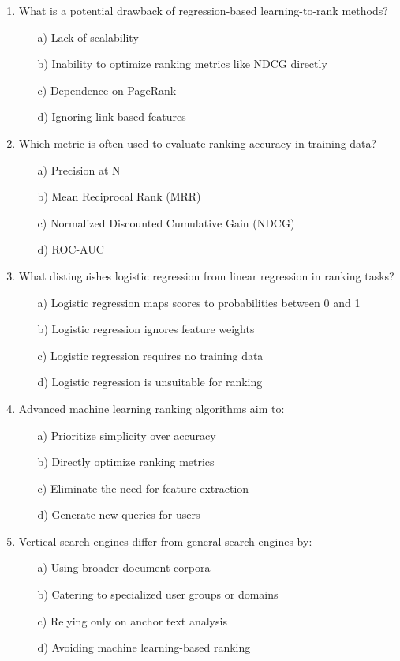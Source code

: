\documentclass[8pt]{extarticle}
\begin{document}
\begin{multicols}{2}
\begin{enumerate}
\item What is a potential drawback of regression-based learning-to-rank methods?
\begin{itemize}
\item[a)] Lack of scalability
\item[b)] Inability to optimize ranking metrics like NDCG directly
\item[c)] Dependence on PageRank
\item[d)] Ignoring link-based features
\end{itemize}

\item Which metric is often used to evaluate ranking accuracy in training data?
\begin{itemize}
\item[a)] Precision at N
\item[b)] Mean Reciprocal Rank (MRR)
\item[c)] Normalized Discounted Cumulative Gain (NDCG)
\item[d)] ROC-AUC
\end{itemize}

\item What distinguishes logistic regression from linear regression in ranking tasks?
\begin{itemize}
\item[a)] Logistic regression maps scores to probabilities between 0 and 1
\item[b)] Logistic regression ignores feature weights
\item[c)] Logistic regression requires no training data
\item[d)] Logistic regression is unsuitable for ranking
\end{itemize}

\item Advanced machine learning ranking algorithms aim to:
\begin{itemize}
\item[a)] Prioritize simplicity over accuracy
\item[b)] Directly optimize ranking metrics
\item[c)] Eliminate the need for feature extraction
\item[d)] Generate new queries for users
\end{itemize}

\item Vertical search engines differ from general search engines by:
\begin{itemize}
\item[a)] Using broader document corpora
\item[b)] Catering to specialized user groups or domains
\item[c)] Relying only on anchor text analysis
\item[d)] Avoiding machine learning-based ranking
\end{itemize}


\end{enumerate}
\end{multicols}
\end{document}
